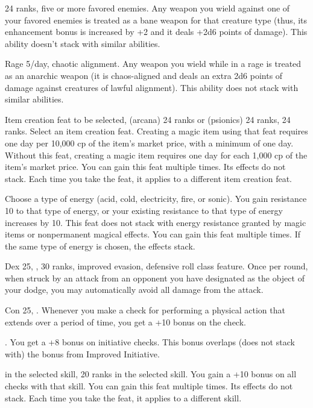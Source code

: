 { 24 ranks, five or more favored enemies.}
{Any weapon you wield against one of your favored enemies is treated as a bane weapon for that creature type (thus, its enhancement bonus is increased by +2 and it deals +2d6 points of damage). This ability doesn't stack with similar abilities.}

{Rage 5/day, chaotic alignment.}
{Any weapon you wield while in a rage is treated as an anarchic weapon (it is chaos-aligned and deals an extra 2d6 points of damage against creatures of lawful alignment). This ability does not stack with similar abilities.}

{}
{Item creation feat to be selected,  (arcana) 24 ranks or  (psionics) 24 ranks,  24 ranks.}
{Select an item creation feat. Creating a magic item using that feat requires one day per 10,000 cp of the item's market price, with a minimum of one day.}
{Without this feat, creating a magic item requires one day for each 1,000 cp of the item's market price.}
{You can gain this feat multiple times. Its effects do not stack. Each time you take the feat, it applies to a different item creation feat.}

{}{}
{Choose a type of energy (acid, cold, electricity, fire, or sonic). You gain resistance 10 to that type of energy, or your existing resistance to that type of energy increases by 10. This feat does not stack with energy resistance granted by magic items or nonpermanent magical effects.}
{}{You can gain this feat multiple times. If the same type of energy is chosen, the effects stack.}

{Dex 25, ,  30 ranks, improved evasion, defensive roll class feature.}
{Once per round, when struck by an attack from an opponent you have designated as the object of your dodge, you may automatically avoid all damage from the attack.}

{Con 25, .}
{Whenever you make a check for performing a physical action that extends over a period of time, you get a +10 bonus on the check.}

{.}
{You get a +8 bonus on initiative checks. This bonus overlaps (does not stack with) the bonus from Improved Initiative.}

{}
{ in the selected skill, 20 ranks in the selected skill.}
{You gain a +10 bonus on all checks with that skill.}
{}{You can gain this feat multiple times. Its effects do not stack. Each time you take the feat, it applies to a different skill.}

